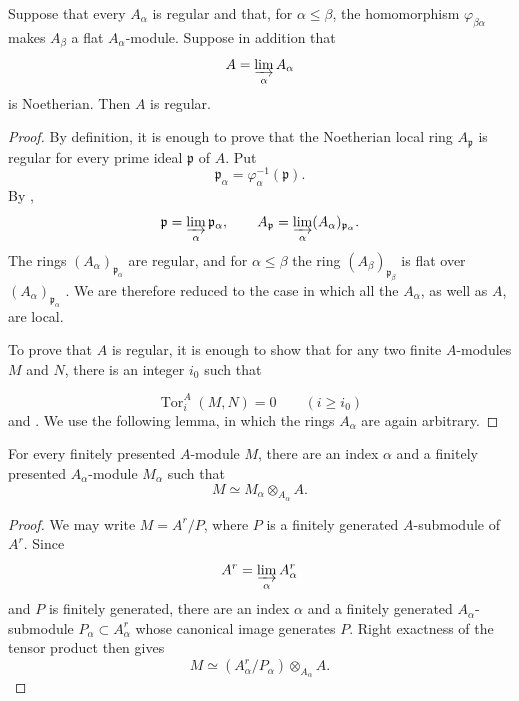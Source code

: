 \begin{proposition}[5.13.7]
\label{IV.5.13.7}
Suppose that every $A_\alpha$ is regular and that, for
$\alpha\leq\beta$, the homomorphism $\varphi_{\beta\alpha}$
makes $A_\beta$ a flat $A_\alpha$-module.  Suppose in addition
that
\[
  A=\varinjlim_\alpha A_\alpha
\]
is Noetherian.  Then $A$ is regular.
\end{proposition}

\begin{proof}
By definition, it is enough to prove that the Noetherian local
ring $A_{\mathfrak p}$ is regular for every prime ideal
$\mathfrak p$ of $A$.  Put
\[
  \mathfrak p_\alpha
  =\varphi_\alpha^{-1}(\mathfrak p).
\]
By ,
\[
  \mathfrak p=\varinjlim_\alpha\mathfrak p_\alpha,
  \qquad
  A_{\mathfrak p}
  =\varinjlim_\alpha(A_\alpha)_{\mathfrak p_\alpha}.
\]
The rings $(A_\alpha)_{\mathfrak p_\alpha}$ are regular, and for
$\alpha\leq\beta$ the ring
$(A_\beta)_{\mathfrak p_\beta}$ is flat over
$(A_\alpha)_{\mathfrak p_\alpha}$ .  We are
therefore reduced to the case in which all the $A_\alpha$, as
well as $A$, are local.

To prove that $A$ is regular, it is enough to show that for any
two finite $A$-modules $M$ and $N$, there is an integer $i_0$
such that


\[
  \operatorname{Tor}^{A}_i(M,N)=0
  \qquad(i\geq i_0)
\]
 and .  We use the following
lemma, in which the rings $A_\alpha$ are again arbitrary.
\end{proof}

\begin{lemma}[5.13.7.1]
\label{IV.5.13.7.1}
For every finitely presented $A$-module $M$, there are an index
$\alpha$ and a finitely presented $A_\alpha$-module $M_\alpha$
such that
\[
  M\simeq M_\alpha\otimes_{A_\alpha}A.
\]
\end{lemma}

\begin{proof}
We may write $M=A^r/P$, where $P$ is a finitely generated
$A$-submodule of $A^r$.  Since
\[
  A^r=\varinjlim_\alpha A_\alpha^r
\]
and $P$ is finitely generated, there are an index $\alpha$ and a
finitely generated $A_\alpha$-submodule
$P_\alpha\subset A_\alpha^r$ whose canonical image generates
$P$.  Right exactness of the tensor product then gives
\[
  M
  \simeq
  (A_\alpha^r/P_\alpha)\otimes_{A_\alpha}A.
\]
\end{proof}

